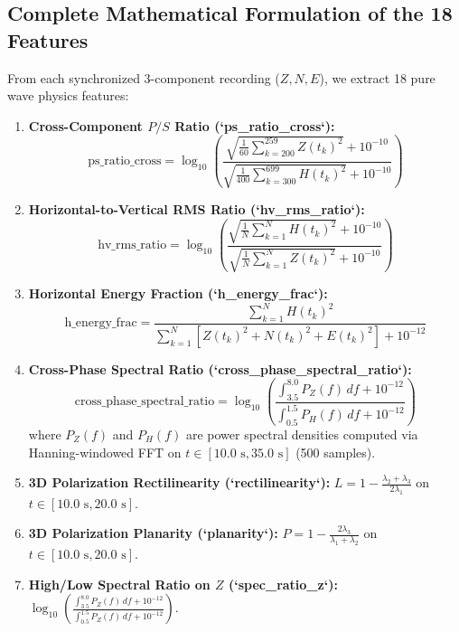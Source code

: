 \documentclass[11pt,a4paper]{article}
\begin{document}
\subsection{Complete Mathematical Formulation of the 18 Features}
From each synchronized 3-component recording ($Z, N, E$), we extract 18 pure wave physics features:
\begin{enumerate}\setlength{\itemsep}{2pt}\setlength{\parskip}{0pt}
    \item \textbf{Cross-Component $P/S$ Ratio (`ps\_ratio\_cross`):}
    \begin{equation*}
        \text{ps\_ratio\_cross} = \log_{10} \left( \frac{\sqrt{\frac{1}{60} \sum_{k=200}^{259} Z(t_k)^2} + 10^{-10}}{\sqrt{\frac{1}{400} \sum_{k=300}^{699} H(t_k)^2} + 10^{-10}} \right)
    \end{equation*}
    \item \textbf{Horizontal-to-Vertical RMS Ratio (`hv\_rms\_ratio`):}
    \begin{equation*}
        \text{hv\_rms\_ratio} = \log_{10} \left( \frac{\sqrt{\frac{1}{N} \sum_{k=1}^N H(t_k)^2} + 10^{-10}}{\sqrt{\frac{1}{N} \sum_{k=1}^N Z(t_k)^2} + 10^{-10}} \right)
    \end{equation*}
    \item \textbf{Horizontal Energy Fraction (`h\_energy\_frac`):}
    \begin{equation*}
        \text{h\_energy\_frac} = \frac{\sum_{k=1}^N H(t_k)^2}{\sum_{k=1}^N [Z(t_k)^2 + N(t_k)^2 + E(t_k)^2] + 10^{-12}}
    \end{equation*}
    \item \textbf{Cross-Phase Spectral Ratio (`cross\_phase\_spectral\_ratio`):}
    \begin{equation*}
        \text{cross\_phase\_spectral\_ratio} = \log_{10} \left( \frac{\int_{3.5}^{8.0} P_Z(f) \, df + 10^{-12}}{\int_{0.5}^{1.5} P_H(f) \, df + 10^{-12}} \right)
    \end{equation*}
    where $P_Z(f)$ and $P_H(f)$ are power spectral densities computed via Hanning-windowed FFT on $t \in [10.0\text{ s}, 35.0\text{ s}]$ (500 samples).
    \item \textbf{3D Polarization Rectilinearity (`rectilinearity`):} $L = 1 - \frac{\lambda_2 + \lambda_3}{2\lambda_1}$ on $t \in [10.0\text{ s}, 20.0\text{ s}]$.
    \item \textbf{3D Polarization Planarity (`planarity`):} $P = 1 - \frac{2\lambda_3}{\lambda_1 + \lambda_2}$ on $t \in [10.0\text{ s}, 20.0\text{ s}]$.
    \item \textbf{High/Low Spectral Ratio on $Z$ (`spec\_ratio\_z`):} $\log_{10} \left( \frac{\int_{3.5}^{8.0} P_Z(f) \, df + 10^{-12}}{\int_{0.5}^{1.5} P_Z(f) \, df + 10^{-12}} \right)$.

\end{enumerate}
\end{document}
